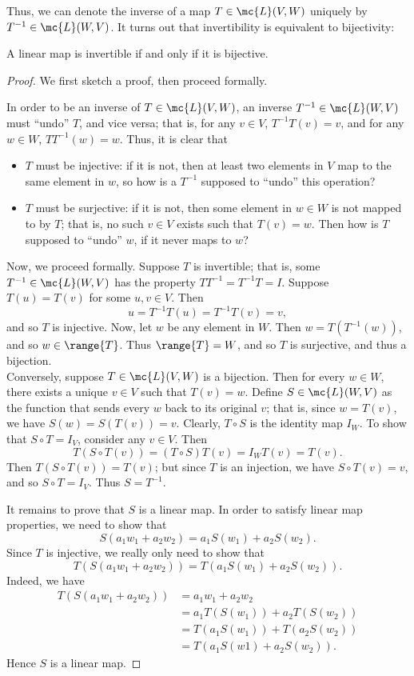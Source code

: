\documentclass[math0540-lecture-notes.tex]{subfiles}
\begin{document}
Thus, we can denote the inverse of a map $T\in \mc{L}(V,W)$ uniquely by $T^{-1}\in \mc{L}(W,V)$. It
turns out that invertibility is equivalent to bijectivity:
\begin{proposition}[]{}
  A linear map is invertible if and only if it is bijective.
\end{proposition}
\begin{proof}[Proof]
  We first sketch a proof, then proceed formally.

  In order to be an inverse of $T \in \mc{L}(V,W)$, an inverse $T ^{-1}\in \mc{L}(W,V)$ must
  ``undo'' $T$, and vice versa; that is, for any $v\in V$, $T^{-1}T(v)=v$, and for any $w\in W$,
  $TT^{-1}(w)=w$. Thus, it is clear that
  \begin{itemize}
    \item $T$ must be injective: if it is not, then at least two elements in $V$ map to the same
      element in $w$, so how is a $T^{-1}$ supposed to ``undo'' this operation?
    \item $T$ must be surjective: if it is not, then some element in $w\in W$ is not mapped to by
      $T$; that is, no such $v\in V$ exists such that $T(v)=w$. Then how is $T$ supposed to ``undo''
      $w$, if it never maps to $w$?
  \end{itemize}

  Now, we proceed formally. Suppose $T$ is invertible; that is, some $T^{-1}\in \mc{L}(W,V)$ has the
  property $TT^{-1}=T^{-1}T=I$. Suppose $T(u)=T(v)$ for some $u,v\in V$. Then \[
    u=T^{-1}T(u)=T^{-1}T(v)=v
  ,\] and so $T$ is injective. Now, let $w$ be any element in $W$. Then $w=T(T^{-1}(w))$, and so
  $w\in \range{T}$. Thus $\range{T}=W$, and so $T$ is surjective, and thus a bijection.\\

  Conversely, suppose $T\in \mc{L}(V,W)$ is a bijection. Then for every $w\in W$, there exists a
  unique $v\in V$ such that $T(v)=w$. Define $S\in \mc{L}(W,V)$ as the function that sends every
  $w$ back to its original $v$; that is, since $w=T(v)$, we have $S(w)=S(T(v))=v$. Clearly, $T\circ
  S$ is the identity map $I_W$. To show that $S\circ T=I_V$, consider any $v\in V$. Then \[
    T(S\circ T(v))=(T\circ S)T(v)=I_WT(v)=T(v)
  .\] Then $T(S\circ T(v))=T(v)$; but since $T$ is an injection, we have $S\circ T(v)=v$, and so
  $S\circ T=I_V$. Thus $S=T^{-1}$.

  It remains to prove that $S$ is a linear map. In order to satisfy linear map properties, we need
  to show that \[
    S(a_1w_1+a_2w_2)=a_1S(w_1)+a_2S(w_2)
  .\] Since $T$ is injective, we really only need to show that \[
    T(S(a_1w_1+a_2w_2))=T(a_1S(w_1)+a_2S(w_2))
  .\] Indeed, we have
  \begin{align*}
    T(S(a_1w_1+a_2w_2))&= a_1w_1+a_2w_2 \\
                       &= a_1T(S(w_1))+a_2T(S(w_2)) \\
                       &= T(a_1S(w_1))+T(a_2S(w_2)) \\
                       &= T(a_1S(w1)+a_2S(w_2))
  .\end{align*} Hence $S$ is a linear map.
\end{proof}
\end{document}
